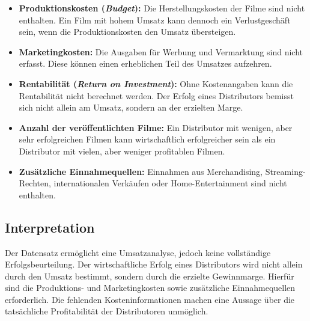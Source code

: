 \begin{itemize}
    \item \textbf{Produktionskosten (\textit{Budget}):} Die Herstellungskosten der Filme sind nicht enthalten. Ein Film mit hohem Umsatz kann dennoch ein Verlustgeschäft sein, wenn die Produktionskosten den Umsatz übersteigen.
    \item \textbf{Marketingkosten:} Die Ausgaben für Werbung und Vermarktung sind nicht erfasst. Diese können einen erheblichen Teil des Umsatzes aufzehren.
    \item \textbf{Rentabilität (\textit{Return on Investment}):} Ohne Kostenangaben kann die Rentabilität nicht berechnet werden. Der Erfolg eines Distributors bemisst sich nicht allein am Umsatz, sondern an der erzielten Marge.
    \item \textbf{Anzahl der veröffentlichten Filme:} Ein Distributor mit wenigen, aber sehr erfolgreichen Filmen kann wirtschaftlich erfolgreicher sein als ein Distributor mit vielen, aber weniger profitablen Filmen.
    \item \textbf{Zusätzliche Einnahmequellen:} Einnahmen aus Merchandising, Streaming-Rechten, internationalen Verkäufen oder Home-Entertainment sind nicht enthalten.
\end{itemize}

\subsection{Interpretation}

Der Datensatz ermöglicht eine Umsatzanalyse, jedoch keine vollständige Erfolgsbeurteilung. Der wirtschaftliche Erfolg eines Distributors wird nicht allein durch den Umsatz bestimmt, sondern durch die erzielte Gewinnmarge. Hierfür sind die Produktions- und Marketingkosten sowie zusätzliche Einnahmequellen erforderlich. Die fehlenden Kosteninformationen machen eine Aussage über die tatsächliche Profitabilität der Distributoren unmöglich.

